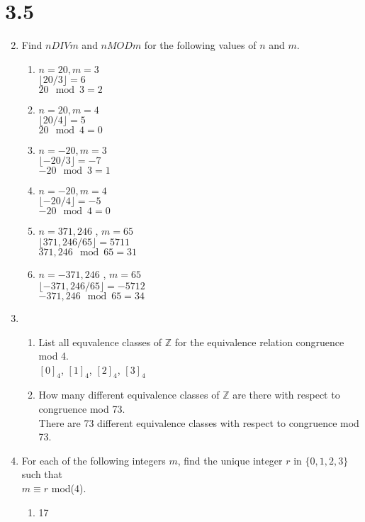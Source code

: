 \documentclass[11pt]{article}
\newcommand{\Z}{\mathbb{Z}}
\begin{document}
\section*{3.5}
\begin{enumerate}
\setcounter{enumi}{1}
\item Find $n DIV m$ and $n MOD m$ for the following values of $n$ and $m$.
	\begin{enumerate}
	\item $n=20,m=3$\\
	$\lfloor20/3\rfloor=6$\\$20\mod3=2$
	\item $n=20,m=4$\\
	$\lfloor20/4\rfloor=5$\\$20\mod4=0$
	\item $n=-20,m=3$\\
	$\lfloor-20/3\rfloor=-7$\\$-20\mod3=1$
	\item $n=-20,m=4$\\
	$\lfloor-20/4\rfloor=-5$\\$-20\mod4=0$
	\item $n=371,246$ , $m=65$\\	
	$\lfloor371,246/65\rfloor=5711$\\$371,246\mod65=31$
	\item $n=-371,246$ , $m=65$\\	
	$\lfloor-371,246/65\rfloor=-5712$\\$-371,246\mod65=34$
	\end{enumerate}
\setcounter{enumi}{3}
\item 
	\begin{enumerate}
	\item List all equvalence classes of $\Z$ for the equivalence relation congruence mod 4.\\
	$[0]_4$, $[1]_4$, $[2]_4$, $[3]_4$
	\item How many different equivalence classes of $\Z$ are there with respect to \\congruence mod 73.\\
	There are 73 different equivalence classes with respect to congruence mod 73.
	\end{enumerate}
\item For each of the following integers $m$, find the unique integer $r$ in $\{0,1,2,3\}$ such that \\$m\equiv r$ mod(4).
	\begin{enumerate}
	\item 17\\

\end{enumerate}
\end{enumerate}
\end{document}

